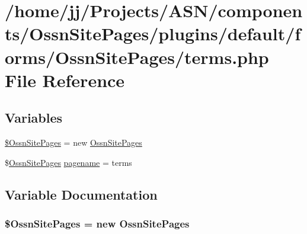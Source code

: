\hypertarget{plugins_2default_2forms_2_ossn_site_pages_2terms_8php}{}\section{/home/jj/\+Projects/\+A\+S\+N/components/\+Ossn\+Site\+Pages/plugins/default/forms/\+Ossn\+Site\+Pages/terms.php File Reference}
\label{plugins_2default_2forms_2_ossn_site_pages_2terms_8php}
\subsection*{Variables}
\begin{DoxyCompactItemize}
\item 
\hyperlink{plugins_2default_2forms_2_ossn_site_pages_2terms_8php_ae6d62adf54fdace37cf84f4a754bcc3b}{\$\+Ossn\+Site\+Pages} = new \hyperlink{class_ossn_site_pages}{Ossn\+Site\+Pages}
\item 
\$\hyperlink{class_ossn_site_pages}{Ossn\+Site\+Pages} \hyperlink{plugins_2default_2forms_2_ossn_site_pages_2terms_8php_a790771bf91bb6454bf0c60185eb09c9f}{pagename} = \textquotesingle{}terms\textquotesingle{}
\end{DoxyCompactItemize}


\subsection{Variable Documentation}
\subsubsection[{\texorpdfstring{\$\+Ossn\+Site\+Pages}{$OssnSitePages}}]{\setlength{\rightskip}{0pt plus 5cm}\${\bf Ossn\+Site\+Pages} = new {\bf Ossn\+Site\+Pages}}\hypertarget{plugins_2default_2forms_2_ossn_site_pages_2terms_8php_ae6d62adf54fdace37cf84f4a754bcc3b}{}\label{plugins_2default_2forms_2_ossn_site_pages_2terms_8php_ae6d62adf54fdace37cf84f4a754bcc3b}


